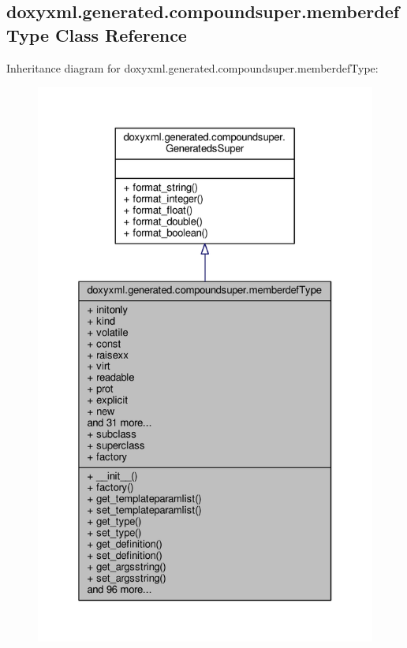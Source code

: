 \subsection{doxyxml.\+generated.\+compoundsuper.\+memberdef\+Type Class Reference}
\label{classdoxyxml_1_1generated_1_1compoundsuper_1_1memberdefType}


Inheritance diagram for doxyxml.\+generated.\+compoundsuper.\+memberdef\+Type\+:
\nopagebreak
\begin{figure}[H]
\begin{center}
\leavevmode
\includegraphics[width=325pt]{d0/d64/classdoxyxml_1_1generated_1_1compoundsuper_1_1memberdefType__inherit__graph}
\end{center}
\end{figure}



